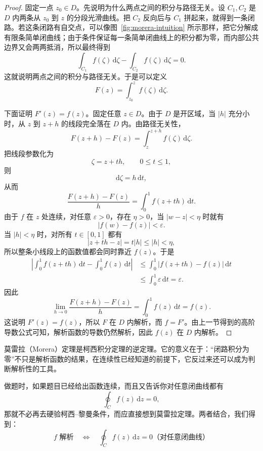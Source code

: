 \begin{proof}
固定一点 $z_0\in D$。先说明为什么两点之间的积分与路径无关。设 $C_1,C_2$ 是 $D$ 内两条从 $z_0$ 到 $z$ 的分段光滑曲线。把 $C_2$ 反向后与 $C_1$ 拼起来，就得到一条闭路。若这条闭路有自交点，可以像图~\ref{fig:morera-intuition} 所示那样，把它分解成有限条简单闭曲线；由于条件保证每一条简单闭曲线上的积分都为零，而内部公共边界又会两两抵消，所以最终得到
\[
    \int_{C_1} f(\zeta)\,\mathrm{d}\zeta-\int_{C_2} f(\zeta)\,\mathrm{d}\zeta = 0.
\]
这就说明两点之间的积分与路径无关。于是可以定义
\[
    F(z) = \int_{z_0}^z f(\zeta)\,\mathrm{d}\zeta.
\]

下面证明 $F'(z)=f(z)$。固定任意 $z\in D$。由于 $D$ 是开区域，当 $|h|$ 充分小时，从 $z$ 到 $z+h$ 的线段完全落在 $D$ 内。由路径无关性，
\[
    F(z+h)-F(z)=\int_z^{z+h} f(\zeta)\,\mathrm{d}\zeta.
\]
把线段参数化为
\[
    \zeta=z+th,\qquad 0\le t\le 1,
\]
则
\[
    \mathrm{d}\zeta=h\,\mathrm{d}t,
\]
从而
\[
    \frac{F(z+h)-F(z)}{h}
    = \int_0^1 f(z+th)\,\mathrm{d}t.
\]
由于 $f$ 在 $z$ 处连续，对任意 $\varepsilon>0$，存在 $\eta>0$，当 $|w-z|<\eta$ 时就有
\[
    |f(w)-f(z)|<\varepsilon.
\]
当 $|h|<\eta$ 时，对所有 $t\in[0,1]$ 都有
\[
    |z+th-z|=t|h|\le |h|<\eta,
\]
所以整条小线段上的函数值都会同时靠近 $f(z)$。于是
\begin{align}
    \left|\int_0^1 f(z+th)\,\mathrm{d}t-\int_0^1 f(z)\,\mathrm{d}t\right|
    &\le \int_0^1 |f(z+th)-f(z)|\,\mathrm{d}t \\
    &\le \int_0^1 \varepsilon\,\mathrm{d}t = \varepsilon.
\end{align}
因此
\[
    \lim_{h\to 0}\frac{F(z+h)-F(z)}{h}
    = \int_0^1 f(z)\,\mathrm{d}t
    = f(z).
\]
这说明 $F'(z)=f(z)$，所以 $F$ 在 $D$ 内解析，而 $f=F'$。由上一节得到的高阶导数公式可知，解析函数的导数仍然解析，因此 $f(z)$ 在 $D$ 内解析。
\end{proof}

\begin{tishi}[柯西积分定理的逆定理]
    莫雷拉（Morera）定理是柯西积分定理的逆定理。它的意义在于：``闭路积分为零''不只是解析函数的结果，在连续性已经知道的前提下，它反过来还可以成为判断解析性的工具。

做题时，如果题目已经给出函数连续，而且又告诉你对任意闭曲线都有
\[
    \oint_C f(z)\,\mathrm{d}z=0,
\]
那就不必再去硬验柯西--黎曼条件，而应直接想到莫雷拉定理。两者结合，我们得到：
\begin{equation}
    f \text{ 解析} \quad \Longleftrightarrow \quad \oint_C f(z)\,\mathrm{d}z = 0 \text{（对任意闭曲线）}
\end{equation}
\end{tishi}

